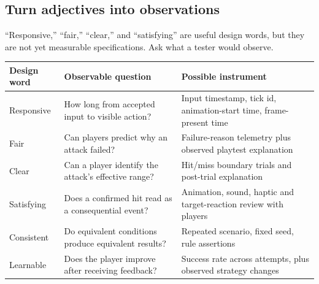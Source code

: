 \subsection{Turn adjectives into observations}\label{05-engine-i-ch009-turn-adjectives-into-observations}

\hypertarget{05-engine-i-ch009-turn-adjectives-into-observations}{}

``Responsive,'' ``fair,'' ``clear,'' and ``satisfying'' are useful design words, but they are not yet measurable specifications. Ask what a tester would observe.

{\def\LTcaptype{none} %
\begin{longtable}[]{@{}
  >{\raggedright\arraybackslash}p{}
  >{\raggedright\arraybackslash}p{}
  >{\raggedright\arraybackslash}p{}@{}}
\toprule\noalign{}
\begin{minipage}[b]{\linewidth}\raggedright
Design word
\end{minipage} & \begin{minipage}[b]{\linewidth}\raggedright
Observable question
\end{minipage} & \begin{minipage}[b]{\linewidth}\raggedright
Possible instrument
\end{minipage} \\
\midrule\noalign{}
\endhead
\bottomrule\noalign{}
\endlastfoot
Responsive & How long from accepted input to visible action? & Input timestamp, tick id, animation-start time, frame-present time \\
Fair & Can players predict why an attack failed? & Failure-reason telemetry plus observed playtest explanation \\
Clear & Can a player identify the attack's effective range? & Hit/miss boundary trials and post-trial explanation \\
Satisfying & Does a confirmed hit read as a consequential event? & Animation, sound, haptic and target-reaction review with players \\
Consistent & Do equivalent conditions produce equivalent results? & Repeated scenario, fixed seed, rule assertions \\
Learnable & Does the player improve after receiving feedback? & Success rate across attempts, plus observed strategy changes \\
\end{longtable}
}

